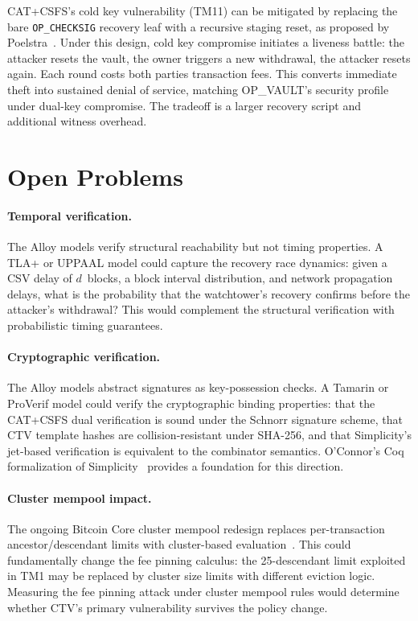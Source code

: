 CAT+CSFS's cold key vulnerability (TM11) can be mitigated by replacing the bare
\texttt{OP\_CHECKSIG} recovery leaf with a recursive staging reset, as proposed by
Poelstra~\cite{Poe21}. Under this design, cold key compromise initiates a liveness
battle: the attacker resets the vault, the owner triggers a new withdrawal, the
attacker resets again. Each round costs both parties transaction fees. This converts
immediate theft into sustained denial of service, matching OP\_VAULT's security
profile under dual-key compromise. The tradeoff is a larger recovery script and
additional witness overhead.

\section{Open Problems} \label{se:open_problems}

\paragraph{Temporal verification.}
The Alloy models verify structural reachability but not timing properties. A TLA+
or UPPAAL model could capture the recovery race dynamics: given a CSV delay of
$d$~blocks, a block interval distribution, and network propagation delays, what is
the probability that the watchtower's recovery confirms before the attacker's
withdrawal? This would complement the structural verification with probabilistic
timing guarantees.

\paragraph{Cryptographic verification.}
The Alloy models abstract signatures as key-possession checks. A Tamarin or ProVerif
model could verify the cryptographic binding properties: that the CAT+CSFS dual
verification is sound under the Schnorr signature scheme, that CTV template hashes
are collision-resistant under SHA-256, and that Simplicity's jet-based verification
is equivalent to the combinator semantics. O'Connor's Coq formalization of
Simplicity~\cite{OC17} provides a foundation for this direction.

\paragraph{Cluster mempool impact.}
The ongoing Bitcoin Core cluster mempool redesign replaces per-transaction
ancestor/descendant limits with cluster-based evaluation~\cite{WD24}. This could
fundamentally change the fee pinning calculus: the 25-descendant limit exploited in
TM1 may be replaced by cluster size limits with different eviction logic. Measuring
the fee pinning attack under cluster mempool rules would determine whether CTV's
primary vulnerability survives the policy change.

